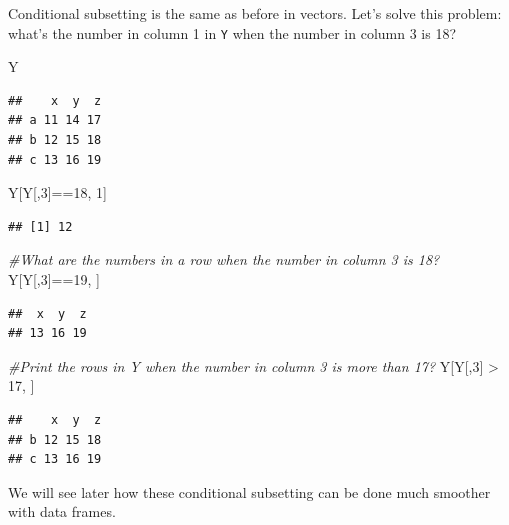 \documentclass[
]{book}
\newenvironment{Shaded}{\begin{snugshade}}{\end{snugshade}}
\newcommand{\CommentTok}[1]{\textcolor[rgb]{0.56,0.35,0.01}{\textit{#1}}}
\newcommand{\DecValTok}[1]{\textcolor[rgb]{0.00,0.00,0.81}{#1}}
\newcommand{\NormalTok}[1]{#1}
\newcommand{\SpecialCharTok}[1]{\textcolor[rgb]{0.00,0.00,0.00}{#1}}
\theoremstyle{definition}
\theoremstyle{definition}
\theoremstyle{definition}
\theoremstyle{definition}
\theoremstyle{remark}
\begin{document}
Conditional subsetting is the same as before in vectors. Let's solve this problem: what's the number in column 1 in \texttt{Y} when the number in column 3 is 18?

\begin{Shaded}
\begin{Highlighting}[]
\NormalTok{Y}
\end{Highlighting}
\end{Shaded}

\begin{verbatim}
##    x  y  z
## a 11 14 17
## b 12 15 18
## c 13 16 19
\end{verbatim}

\begin{Shaded}
\begin{Highlighting}[]
\NormalTok{Y[Y[,}\DecValTok{3}\NormalTok{]}\SpecialCharTok{==}\DecValTok{18}\NormalTok{, }\DecValTok{1}\NormalTok{]}
\end{Highlighting}
\end{Shaded}

\begin{verbatim}
## [1] 12
\end{verbatim}

\begin{Shaded}
\begin{Highlighting}[]
\CommentTok{\#What are the numbers in a row when the number in column 3 is 18?}
\NormalTok{Y[Y[,}\DecValTok{3}\NormalTok{]}\SpecialCharTok{==}\DecValTok{19}\NormalTok{, ]}
\end{Highlighting}
\end{Shaded}

\begin{verbatim}
##  x  y  z 
## 13 16 19
\end{verbatim}

\begin{Shaded}
\begin{Highlighting}[]
\CommentTok{\#Print the rows in Y when the number in column 3 is more than 17?}
\NormalTok{Y[Y[,}\DecValTok{3}\NormalTok{] }\SpecialCharTok{\textgreater{}} \DecValTok{17}\NormalTok{, ]}
\end{Highlighting}
\end{Shaded}

\begin{verbatim}
##    x  y  z
## b 12 15 18
## c 13 16 19
\end{verbatim}

We will see later how these conditional subsetting can be done much smoother with data frames.
\end{document}
